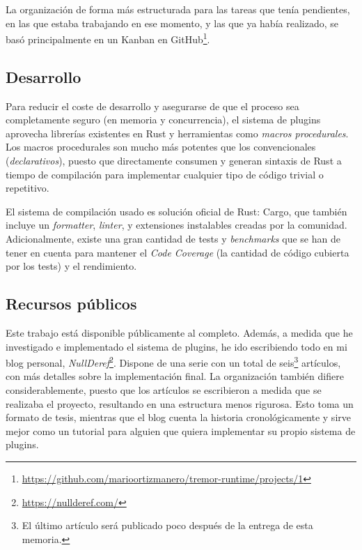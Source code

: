 La organización de forma más estructurada para las tareas que tenía pendientes,
en las que estaba trabajando en ese momento, y las que ya había realizado, se
basó principalmente en un Kanban en
GitHub\footnote{\url{https://github.com/marioortizmanero/tremor-runtime/projects/1}}.

\subsection{Desarrollo}

Para reducir el coste de desarrollo y asegurarse de que el proceso sea
completamente seguro (en memoria y concurrencia), el sistema de plugins
aprovecha librerías existentes en Rust y herramientas como \emph{macros
procedurales}. Los macros procedurales son mucho más potentes que los
convencionales (\emph{declarativos}), puesto que directamente consumen y generan
sintaxis de Rust a tiempo de compilación para implementar cualquier tipo de
código trivial o repetitivo.

El sistema de compilación usado es solución oficial de Rust: Cargo, que también
incluye un \emph{formatter}, \emph{linter}, y extensiones instalables creadas
por la comunidad. Adicionalmente, existe una gran cantidad de tests y
\emph{benchmarks} que se han de tener en cuenta para mantener el \emph{Code
Coverage} (la cantidad de código cubierta por los tests) y el rendimiento.

\subsection{Recursos públicos}

Este trabajo está disponible públicamente al completo. Además, a medida que he
investigado e implementado el sistema de plugins, he ido escribiendo todo en mi
blog personal, \emph{NullDeref}\footnote{\url{https://nullderef.com/}}. Dispone
de una serie con un total de seis\footnote{El último artículo será publicado
poco después de la entrega de esta memoria.} artículos, con más detalles sobre
la implementación final. La organización también difiere considerablemente,
puesto que los artículos se escribieron a medida que se realizaba el proyecto,
resultando en una estructura menos rigurosa. Esto toma un formato de tesis,
mientras que el blog cuenta la historia cronológicamente y sirve mejor como un
tutorial para alguien que quiera implementar su propio sistema de plugins.

